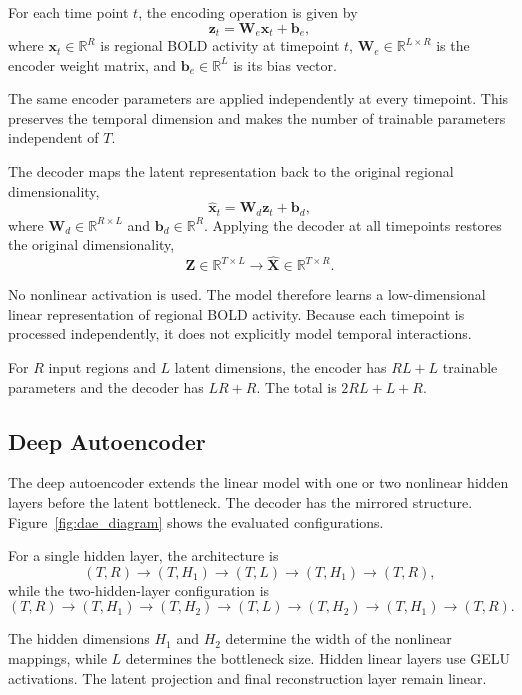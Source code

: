For each time point $t$, the encoding operation is given by
\[
\mathbf{z}_t = \mathbf{W}_e\mathbf{x}_t + \mathbf{b}_e,
\]
where $\mathbf{x}_t\in\mathbb{R}^{R}$ is regional BOLD activity at
timepoint $t$, $\mathbf{W}_e\in\mathbb{R}^{L\times R}$ is the encoder
weight matrix, and $\mathbf{b}_e\in\mathbb{R}^{L}$ is its bias vector.

The same encoder parameters are applied independently at every
timepoint. This preserves the temporal dimension and makes the number of
trainable parameters independent of $T$.

The decoder maps the latent representation back to the original regional dimensionality,
\[
\hat{\mathbf{x}}_t = \mathbf{W}_d\mathbf{z}_t + \mathbf{b}_d,
\]
where $\mathbf{W}_d\in\mathbb{R}^{R\times L}$ and
$\mathbf{b}_d\in\mathbb{R}^{R}$. Applying the decoder at all timepoints
restores the original dimensionality,
\[
\mathbf{Z}\in\mathbb{R}^{T\times L}
\longrightarrow
\hat{\mathbf{X}}\in\mathbb{R}^{T\times R}.
\]

No nonlinear activation is used. The model therefore learns a
low-dimensional linear representation of regional BOLD activity. Because
each timepoint is processed independently, it does not explicitly model
temporal interactions.

For $R$ input regions and $L$ latent dimensions, the encoder has
$RL+L$ trainable parameters and the decoder has $LR+R$. The total is
$2RL+L+R$.

\subsection{Deep Autoencoder}

The deep autoencoder extends the linear model with one or two nonlinear
hidden layers before the latent bottleneck. The decoder has the mirrored
structure. Figure~\ref{fig:dae_diagram} shows the evaluated
configurations.

For a single hidden layer, the architecture is
\[
(T,R)\rightarrow(T,H_1)\rightarrow(T,L)\rightarrow(T,H_1)\rightarrow(T,R),
\]
while the two-hidden-layer configuration is
\[
(T,R)\rightarrow(T,H_1)\rightarrow(T,H_2)\rightarrow(T,L)
\rightarrow(T,H_2)\rightarrow(T,H_1)\rightarrow(T,R).
\]

The hidden dimensions $H_1$ and $H_2$ determine the width of the
nonlinear mappings, while $L$ determines the bottleneck size. Hidden
linear layers use GELU activations. The latent projection and final
reconstruction layer remain linear.

